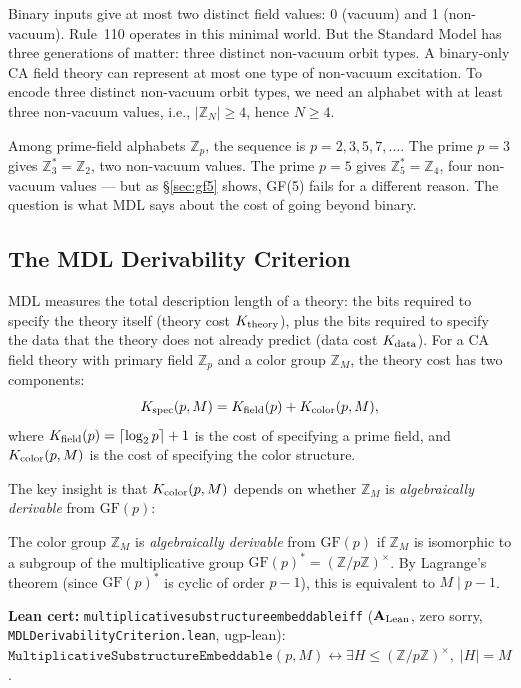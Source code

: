 \documentclass[11pt,openany]{book}
\theoremstyle{remark}
\newcommand{\lean}[1]{%
  \penalty-100
  \begingroup\def\_{\textunderscore\allowbreak}\texttt{#1}\endgroup}
\newcommand{\CatAL}{\ensuremath{\textbf{A}_{\rm Lean}}}
\begin{document}
Binary inputs give at most two distinct field values: 0 (vacuum) and 1 (non-vacuum).
Rule~110 operates in this minimal world. But the Standard Model has three generations
of matter: three distinct non-vacuum orbit types. A binary-only CA field theory can
represent at most one type of non-vacuum excitation. To encode three distinct
non-vacuum orbit types, we need an alphabet with at least three non-vacuum values,
i.e., $|\mathbb{Z}_N| \geq 4$, hence $N \geq 4$.

Among prime-field alphabets $\mathbb{Z}_p$, the sequence is $p = 2, 3, 5, 7, \ldots$.
The prime $p = 3$ gives $\mathbb{Z}_3^* = \mathbb{Z}_2$, two non-vacuum values. The
prime $p = 5$ gives $\mathbb{Z}_5^* = \mathbb{Z}_4$, four non-vacuum values --- but
as \S\ref{sec:gf5} shows, GF(5) fails for a different reason. The question is what
MDL says about the cost of going beyond binary.

\subsection*{The MDL Derivability Criterion}

MDL measures the total description length of a theory: the bits required to specify
the theory itself (theory cost $K_{\rm theory}$), plus the bits required to specify
the data that the theory does not already predict (data cost $K_{\rm data}$). For a
CA field theory with primary field $\mathbb{Z}_p$ and a color group $\mathbb{Z}_M$,
the theory cost has two components:
\begin{equation}
  K_{\rm spec}(p, M) = K_{\rm field}(p) + K_{\rm color}(p, M),
\end{equation}
where $K_{\rm field}(p) = \lceil\log_2 p\rceil + 1$ is the cost of specifying a
prime field, and $K_{\rm color}(p,M)$ is the cost of specifying the color structure.

The key insight is that $K_{\rm color}(p,M)$ depends on whether $\mathbb{Z}_M$ is
\emph{algebraically derivable} from $\mathrm{GF}(p)$:

\begin{tcolorbox}[colback=green!5,colframe=green!50!black,
  title={Definition: Algebraic Derivability}]
The color group $\mathbb{Z}_M$ is \emph{algebraically derivable} from $\mathrm{GF}(p)$ if
$\mathbb{Z}_M$ is isomorphic to a subgroup of the multiplicative group
$\mathrm{GF}(p)^* = (\mathbb{Z}/p\mathbb{Z})^\times$. By Lagrange's theorem (since
$\mathrm{GF}(p)^*$ is cyclic of order $p-1$), this is equivalent to $M \mid p-1$.

\smallskip\noindent
\textbf{Lean cert:} \lean{multiplicative\_substructure\_embeddable\_iff} (\CatAL,
zero sorry, \texttt{MDLDerivabilityCriterion.lean}, ugp-lean):
$\mathtt{MultiplicativeSubstructureEmbeddable}(p,M) \leftrightarrow
\exists H \leq (\mathbb{Z}/p\mathbb{Z})^\times,\;|H| = M$.
\end{tcolorbox}
\end{document}
